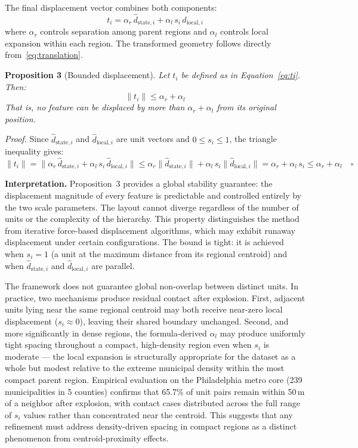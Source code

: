\documentclass[12pt, a4paper]{article}
\numberwithin{equation}{section}
\begin{document}
The final displacement vector combines both components:
\begin{equation}
  \boxed{t_i = \alpha_r\,\hat{d}_{\text{state},i} + \alpha_l\,s_i\,\hat{d}_{\text{local},i}}
  \label{eq:ti}
\end{equation}
where $\alpha_r$ controls separation among parent regions and $\alpha_l$ controls local expansion within each region. The transformed geometry follows directly from~\eqref{eq:translation}.

\begin{mdframed}[linecolor=blue!50!black, linewidth=1pt, topline=true, bottomline=true, rightline=false, leftline=false, innertopmargin=6pt, innerbottommargin=6pt]
\textbf{Proposition 3} (Bounded displacement). \textit{Let $t_i$ be defined as in Equation~\eqref{eq:ti}. Then:}
\[
  \|t_i\| \leq \alpha_r + \alpha_l
\]
\textit{That is, no feature can be displaced by more than $\alpha_r + \alpha_l$ from its original position.}

\smallskip
\textit{Proof.} Since $\hat{d}_{\text{state},i}$ and $\hat{d}_{\text{local},i}$ are unit vectors and $0 \leq s_i \leq 1$, the triangle inequality gives:
\[
  \|t_i\| = \|\alpha_r\,\hat{d}_{\text{state},i} + \alpha_l\,s_i\,\hat{d}_{\text{local},i}\|
           \leq \alpha_r\|\hat{d}_{\text{state},i}\| + \alpha_l\,s_i\|\hat{d}_{\text{local},i}\|
           = \alpha_r + \alpha_l\,s_i \leq \alpha_r + \alpha_l \quad \square
\]
\end{mdframed}

\smallskip
\noindent\textbf{Interpretation.} Proposition~3 provides a global stability guarantee: the displacement magnitude of every feature is predictable and controlled entirely by the two scale parameters. The layout cannot diverge regardless of the number of units or the complexity of the hierarchy. This property distinguishes the method from iterative force-based displacement algorithms, which may exhibit runaway displacement under certain configurations. The bound is tight: it is achieved when $s_i = 1$ (a unit at the maximum distance from its regional centroid) and when $\hat{d}_{\text{state},i}$ and $\hat{d}_{\text{local},i}$ are parallel.

The framework does not guarantee global non-overlap between distinct units. In practice, two mechanisms produce residual contact after explosion. First, adjacent units lying near the same regional centroid may both receive near-zero local displacement ($s_i \approx 0$), leaving their shared boundary unchanged. Second, and more significantly in dense regions, the formula-derived $\alpha_l$ may produce uniformly tight spacing throughout a compact, high-density region even when $s_i$ is moderate --- the local expansion is structurally appropriate for the dataset as a whole but modest relative to the extreme municipal density within the most compact parent region. Empirical evaluation on the Philadelphia metro core (239 municipalities in 5 counties) confirms that 65.7\% of unit pairs remain within 50\,m of a neighbor after explosion, with contact cases distributed across the full range of $s_i$ values rather than concentrated near the centroid. This suggests that any refinement must address density-driven spacing in compact regions as a distinct phenomenon from centroid-proximity effects.
\end{document}
